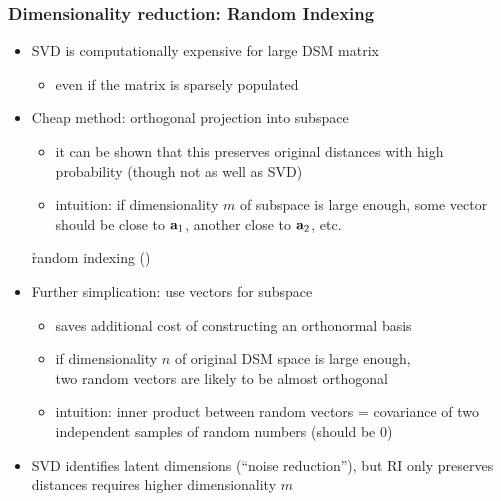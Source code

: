 \begin{frame}
  \frametitle{Dimensionality reduction: Random Indexing}

  \begin{itemize}
  \item SVD is computationally expensive for large DSM matrix
    \begin{itemize}
    \item even if the matrix is sparsely populated
    \end{itemize}
    \pause
  \item Cheap method: orthogonal projection into  subspace
    \begin{itemize}
    \item it can be shown that this preserves original distances with high
      probability (though not as well as SVD)
    \item intuition: if dimensionality $m$ of subspace is large enough, some
      vector should be close to $\va_1$, another close to $\va_2$, etc.
    \end{itemize}
    \So \h{random indexing} ()%
    \pause
  \item Further simplication: use  vectors for subspace
    \begin{itemize}
    \item saves additional cost of constructing an orthonormal basis
    \item if dimensionality $n$ of original DSM space is large enough,\\
      two random vectors are likely to be almost orthogonal
    \item intuition: inner product between random vectors = covariance of two
      independent samples of random numbers (should be 0)
    \end{itemize}
    \pause
  \item SVD identifies latent dimensions (``noise reduction''), but RI only
    preserves distances \so requires higher dimensionality $m$
  \end{itemize}
\end{frame}

